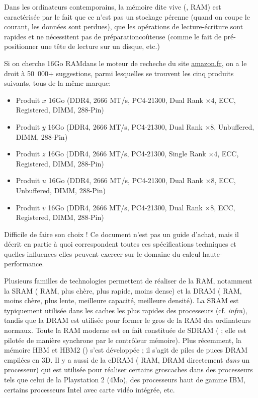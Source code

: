 Dans les ordinateurs contemporains, la mémoire dite \og vive\fg
(, RAM) est caractérisée par le fait que ce n'est
pas un stockage pérenne (quand on coupe le courant, les données sont perdues),
que les opérations de lecture-écriture sont rapides et ne nécessitent pas de \og
préparation\fg coûteuse (comme le fait de pré-positionner une tête de lecture
sur un disque, etc.)

Si on cherche \og 16Go RAM\fg dans le moteur de recheche du site
\url{amazon.fr}, on a le droit à 50\ 000+ suggestions, parmi lesquelles se
trouvent les cinq produits suivants, tous de la même marque:
\begin{itemize}
\item Produit $x$ 16Go (DDR4, 2666 MT/s, PC4-21300, Dual Rank $\times 4$, ECC, Registered, DIMM, 288-Pin)
\item Produit $y$ 16Go (DDR4, 2666 MT/s, PC4-21300, Dual Rank $\times 8$, Unbuffered, DIMM, 288-Pin)
\item Produit $z$ 16Go (DDR4, 2666 MT/s, PC4-21300, Single Rank $\times 4$, ECC, Registered, DIMM, 288-Pin)
\item Produit $u$ 16Go (DDR4, 2666 MT/s, PC4-21300, Dual Rank $\times 8$, ECC, Unbuffered, DIMM, 288-Pin)
\item Produit $v$ 16Go (DDR4, 2666 MT/s, PC4-21300, Dual Rank $\times 8$, ECC, Registered, DIMM, 288-Pin)
\end{itemize}

\medskip

Difficile de faire son choix ! Ce document n'est pas un guide d'achat, mais il
décrit en partie à quoi correspondent toutes ces spécifications techniques et
quelles influences elles peuvent exercer sur le domaine du calcul
haute-performance.

Plusieurs familles de technologies permettent de réaliser de la RAM, notamment
la SRAM ( RAM, plus chère, plus rapide, moins dense) et la DRAM
( RAM, moins chère, plus lente, meilleure capacité, meilleure
densité). La SRAM est typiquement utilisée dans les caches les plus rapides des
processeurs (cf. \textit{infra}), tandis que la DRAM est utilisée pour former le
gros de la RAM des ordinateurs normaux. Toute la RAM moderne est en fait
constituée de SDRAM (\og {} ; elle est pilotée de manière
synchrone par le contrôleur mémoire). Plus récemment, la mémoire HBM et HBM2
(\og {}\fg) s'est développée ; il s'agit de piles
de puces DRAM empilées en 3D. Il y a aussi de la eDRAM ( RAM, DRAM directement \emph{dans} un processeur) qui est utilisée
pour réaliser certains \og gros\fg caches dans des processeurs tels que celui de
la \textsf{Playstation 2} (4Mo), des processeurs haut de gamme IBM, certains
processeurs Intel avec carte vidéo intégrée, etc.

